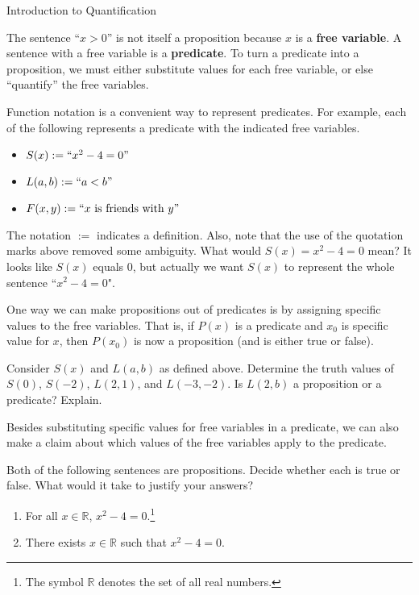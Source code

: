 \begin{section}{Introduction to Quantification}

The sentence ``$x>0$'' is not itself a proposition because $x$ is a \textbf{free variable}. A sentence with a free variable is a \textbf{predicate}. To turn a predicate into a proposition, we must either substitute values for each free variable, or else ``quantify'' the free variables.


Function notation is a convenient way to represent predicates. For example, each of the following represents a predicate with the indicated free variables.
\begin{itemize}
\item $S(x):=``x^2-4=0"$
\item $L(a,b):=``a<b"$
\item $F(x,y):=``x \mbox{ is friends with } y"$
\end{itemize}
The notation $:=$ indicates a definition.  Also, note that the use of the quotation marks above removed some ambiguity.  What would $S(x)=x^2-4=0$ mean?  It looks like $S(x)$ equals 0, but actually we want $S(x)$ to represent the whole sentence ``$x^2-4=0$". 

One way we can make propositions out of predicates is by assigning specific values to the free variables.  That is, if $P(x)$ is a predicate and $x_0$ is specific value for $x$, then $P(x_0)$ is now a proposition (and is either true or false).

\begin{exercise}
Consider $S(x)$ and $L(a,b)$ as defined above. Determine the truth values of $S(0)$, $S(-2)$, $L(2,1)$, and $L(-3,-2)$. Is $L(2,b)$ a proposition or a predicate?  Explain.
\end{exercise}

Besides substituting specific values for free variables in a predicate, we can also make a claim about which values of the free variables apply to the predicate.

\begin{exercise}\label{ex:quantified predicates}
Both of the following sentences are propositions. Decide whether each is true or false. What would it take to justify your answers?
\begin{enumerate}[label=\textrm{(\alph*)}]
\item For all $x\in\mathbb{R}$, $x^2-4=0$.\footnote{The symbol $\mathbb{R}$ denotes the set of all real numbers.}
\item There exists $x\in\mathbb{R}$ such that $x^2-4=0$.
\end{enumerate}
\end{exercise}


\end{section}
